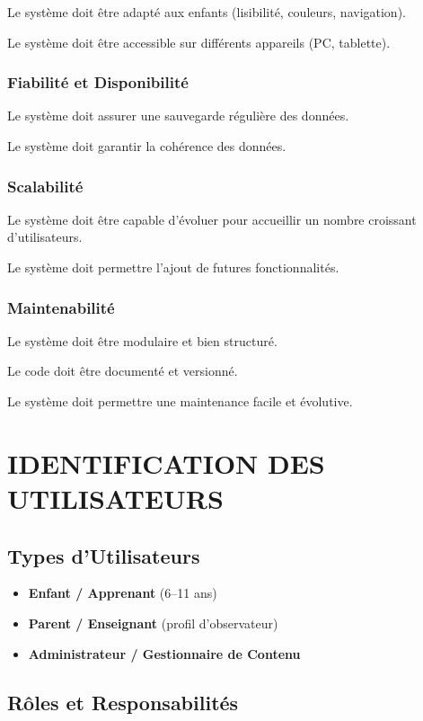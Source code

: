 \documentclass[12pt,a4paper]{article}
\begin{document}
Le système doit être adapté aux enfants (lisibilité, couleurs, navigation).

Le système doit être accessible sur différents appareils (PC, tablette).

\subsubsection{Fiabilité et Disponibilité}

Le système doit assurer une sauvegarde régulière des données.

Le système doit garantir la cohérence des données.

\subsubsection{Scalabilité}

Le système doit être capable d'évoluer pour accueillir un nombre croissant d'utilisateurs.

Le système doit permettre l'ajout de futures fonctionnalités.

\subsubsection{Maintenabilité}

Le système doit être modulaire et bien structuré.

Le code doit être documenté et versionné.

Le système doit permettre une maintenance facile et évolutive.


\section{IDENTIFICATION DES UTILISATEURS}

\subsection{Types d'Utilisateurs}

\begin{itemize}
    \item \textbf{Enfant / Apprenant} (6--11 ans)
    \item \textbf{Parent / Enseignant} (profil d'observateur)
    \item \textbf{Administrateur / Gestionnaire de Contenu}
\end{itemize}

\subsection{Rôles et Responsabilités}
\end{document}
